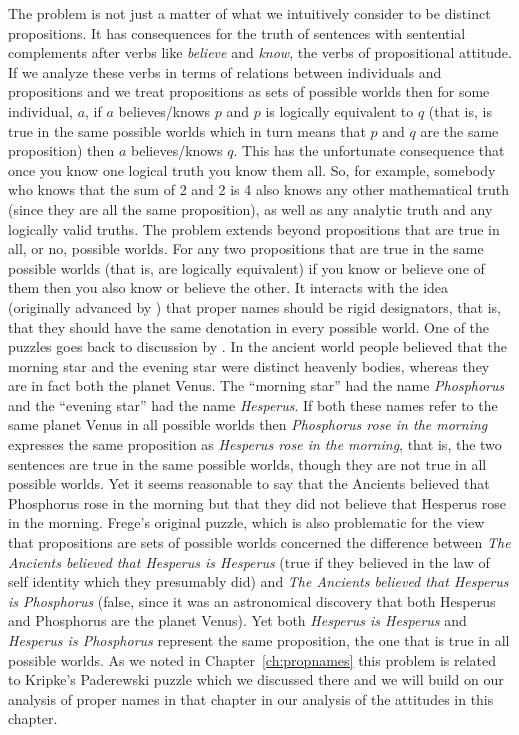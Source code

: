 The problem is not just a matter of what we intuitively consider to be
distinct propositions.  It has consequences for the truth of sentences
with sentential complements after verbs like \textit{believe} and
\textit{know}, the verbs of propositional attitude.  If we analyze
these verbs in terms of relations between individuals and propositions
and we treat propositions as sets of possible worlds then for some
individual, $a$, if $a$ believes/knows $p$ and $p$ is logically
equivalent to $q$ (that is, is true in the same possible worlds which
in turn means that $p$ and $q$ are the same proposition) then $a$
believes/knows $q$.  This has the unfortunate consequence that once
you know one logical truth you know them all. So, for example,
somebody who knows that the sum of 2 and 2 is 4 also knows any other
mathematical truth (since they are all the same proposition), as well
as any analytic truth and any logically valid truths. The problem
extends beyond propositions that are true in all, or no, possible
worlds.  For any two propositions that are true in the same possible
worlds (that is, are logically equivalent) if you know or believe one
of them then you also know or believe the other.  It interacts with
the idea (originally advanced by \citealp{Kripke1972}) that proper
names should be rigid designators, that is, that they should have the
same denotation in every possible world.  One of the puzzles goes back
to discussion by \cite{Frege1892}.  In the ancient world people
believed that the morning star and the evening star were distinct
heavenly bodies, whereas they are in fact both the planet Venus.  The
``morning star'' had the name \textit{Phosphorus} and the ``evening
star'' had the name \textit{Hesperus}.  If both these names refer
to the same planet Venus in all possible worlds then
\textit{Phosphorus rose in the morning} expresses the same proposition
as \textit{Hesperus rose in the morning}, that is, the two sentences
are true in the same possible worlds, though they are not true in all
possible worlds.  Yet it seems reasonable to say that the Ancients
believed that Phosphorus rose in the morning but that they did not
believe that Hesperus rose in the morning.  Frege's original puzzle,
which is also problematic for the view that propositions are sets of
possible worlds concerned the difference between \textit{The Ancients
  believed that Hesperus is Hesperus} (true if they believed in the
law of self identity which they presumably did) and \textit{The
  Ancients believed that Hesperus is Phosphorus} (false, since it was
an astronomical discovery that both Hesperus and Phosphorus are the
planet Venus).  Yet both \textit{Hesperus is Hesperus} and
\textit{Hesperus is Phosphorus} represent the same proposition, the
one that is true in all possible worlds.  As we noted in Chapter~\ref{ch:propnames} this problem
is related to Kripke's Paderewski puzzle which we discussed there and
we will build on our analysis of proper names in that chapter in our
analysis of the attitudes in this chapter.

